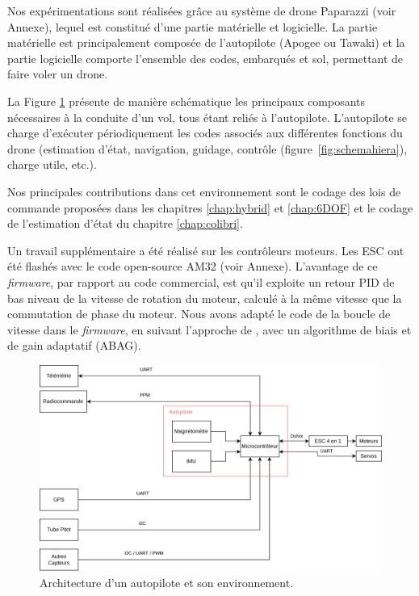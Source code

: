 Nos expérimentations sont réalisées grâce au système de drone Paparazzi (voir Annexe), lequel est constitué d'une partie matérielle et logicielle. La partie matérielle est principalement composée de l'autopilote (Apogee ou Tawaki) et la partie logicielle comporte l'ensemble des codes, embarqués et sol, permettant de faire voler un drone. 

La Figure \ref{fig:schemaComposent} présente de manière schématique les principaux composants nécessaires à la conduite d'un vol, tous étant reliés à l'autopilote. L'autopilote se charge d'exécuter périodiquement les codes associés aux différentes fonctions du drone (estimation d'état, navigation, guidage, contrôle (figure~\ref{fig:schemahiera}), charge utile, etc.).


Nos principales contributions dans cet environnement sont le codage des lois de commande proposées dans les chapitres \ref{chap:hybrid} et \ref{chap:6DOF} et le codage de l'estimation d'état du chapitre \ref{chap:colibri}. 

Un travail supplémentaire a été réalisé sur les contrôleurs moteurs. Les ESC ont été flashés avec le code open-source AM32 (voir Annexe). L'avantage de ce \textit{firmware}, par rapport au code commercial, est qu'il exploite un retour PID de bas niveau de la vitesse de rotation du moteur, calculé à la même vitesse que la commutation de phase du moteur. Nous avons adapté le code de la boucle de vitesse dans le \textit{firmware}, en suivant l'approche de \cite{franchi2017}, avec un algorithme de biais et de gain adaptatif (ABAG). 

\begin{figure}[ht!]
    \centerline{
    \includegraphics[trim=0cm 0cm 0cm 0cm,clip,width=0.9\columnwidth]{figures/arch_materiel.png}}
    \caption{Architecture d'un autopilote et son environnement.}
    \label{fig:schemaComposent}
\end{figure}

